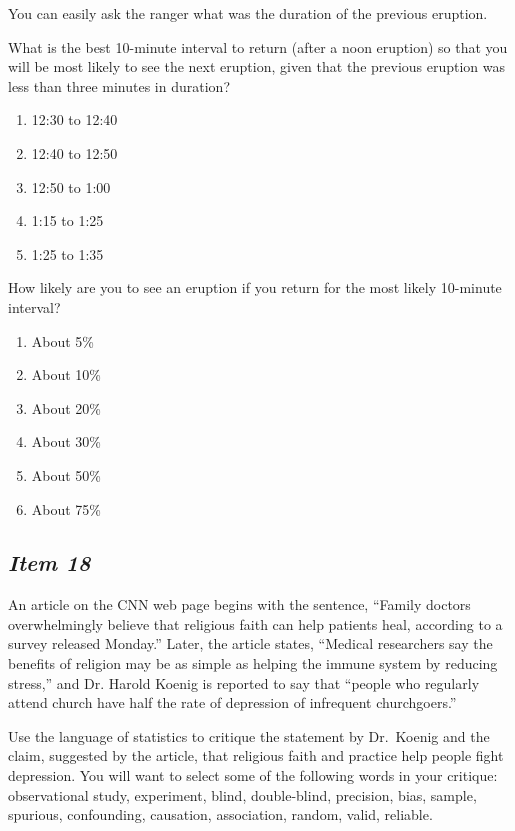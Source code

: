 You can easily ask the ranger what was the duration of the previous
eruption. 

What is the best 10-minute interval to return (after a noon eruption)
so that you will be most likely to see the next eruption, given that
the previous eruption was less than three minutes in duration?

\begin{enumerate}[leftmargin=1cm, itemsep=.1em]
\item 12:30 to 12:40
\item 12:40 to 12:50
\item 12:50 to 1:00
\item 1:15 to 1:25
\item 1:25 to 1:35
\end{enumerate}


\noindent
How likely are you to see an eruption if you return for the most
likely 10-minute interval?

\begin{enumerate}[leftmargin=1cm, itemsep=.1em]
\item About 5\%
\item About 10\%
\item About 20\%
\item About 30\%
\item About 50\%
\item About 75\%
\end{enumerate}


\subsection{\textbf{\textit{Item 18}}}
An article on the CNN web page begins with the sentence, ``Family doctors overwhelmingly believe that religious faith can help patients heal, according to a survey released Monday.''  Later, the article states, ``Medical researchers say the benefits of religion may be as simple as helping the immune system by reducing stress,'' and Dr. Harold Koenig is reported to say that ``people who regularly attend church have half the rate of depression of infrequent churchgoers.''
  
Use the language of statistics to critique the statement by Dr.\ Koenig and the claim, suggested by the article, that religious faith and practice help people fight depression. You will want to select some of the following words in your critique: observational study, experiment, blind, double-blind, precision, bias, sample, spurious, confounding, causation, association, random, valid, reliable.

